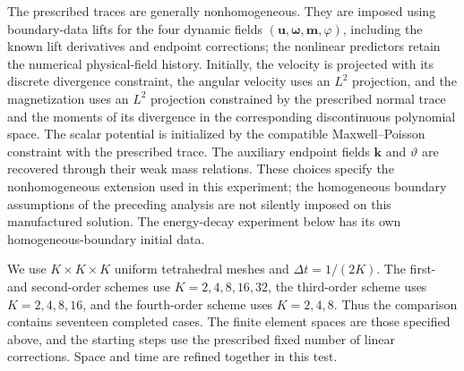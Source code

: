 \documentclass[11pt,a4paper]{article}
\newcommand{\bs}{\boldsymbol}
\newcommand{\dt}{\Delta t}
\theoremstyle{definition}
\numberwithin{equation}{section}
\begin{document}
The prescribed traces are generally nonhomogeneous. They are imposed
using boundary-data lifts for the four dynamic fields
$(\bs u,\bs\omega,\bs m,\varphi)$, including the known lift derivatives
and endpoint corrections; the nonlinear predictors retain the numerical
physical-field history. Initially, the velocity is projected with its
discrete divergence constraint, the angular velocity uses an $L^2$
projection, and the magnetization uses an $L^2$ projection constrained by
the prescribed normal trace and the moments of its divergence in the
corresponding discontinuous polynomial space. The scalar potential is
initialized by the compatible Maxwell--Poisson constraint with the
prescribed trace. The auxiliary endpoint fields $\bs k$ and $\vartheta$
are recovered through their weak mass relations. These choices specify
the nonhomogeneous extension used in this experiment; the homogeneous
boundary assumptions of the preceding analysis are not silently imposed
on this manufactured solution. The energy-decay experiment below has its
own homogeneous-boundary initial data.

We use $K\times K\times K$ uniform tetrahedral meshes and
$\dt=1/(2K)$. The first- and second-order schemes use
$K=2,4,8,16,32$, the third-order scheme uses $K=2,4,8,16$, and the
fourth-order scheme uses $K=2,4,8$. Thus the comparison contains seventeen
completed cases. The finite element spaces are those specified above,
and the starting steps use the prescribed fixed number of linear
corrections. Space and time are refined together in this test.
\end{document}
